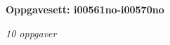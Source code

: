 \centerline{\bf Oppgavesett: i00561no-i00570no}
\vskip 10pt
\centerline{\it 10 oppgaver}\vskip 10pt
\vskip 10pt
